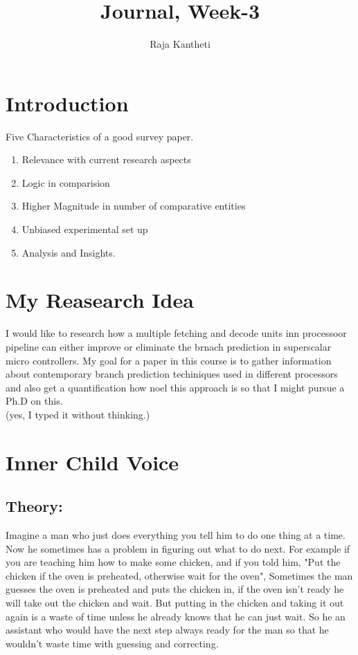 \documentclass{article}
\title{Journal, Week-3}
\author{Raja Kantheti}
\begin{document}
\maketitle

\section{Introduction}
Five Characteristics of a good survey paper.
\begin{enumerate}
    \item Relevance with current research aspects
    \item Logic in comparision
    \item Higher Magnitude in number of comparative entities
    \item Unbiased experimental set up 
    \item Analysis and Insights.
\end{enumerate}

\section{My Reasearch Idea}
I would like to research how a multiple fetching and decode
units inn processoor pipeline can either improve or eliminate
the brnach prediction in superscalar micro controllers. My goal for a paper
in this course is to gather information about contemporary branch prediction techiniques used in 
different processors and also get a quantification how noel this approach is so that I might pursue a Ph.D on this. 
\\
(yes, I typed it without thinking.)

\section{Inner Child Voice}
\subsection{Theory: }
Imagine a man who just does everything you tell him to do one thing at a time. Now he sometimes has a problem in figuring out what to do next.
For example if you are teaching him how to make some chicken, and if you told him, "Put the chicken if the oven is preheated, otherwise wait for the oven", Sometimes the man guesses
the oven is preheated and puts the chicken in, if the oven isn't ready he will take out the chicken and wait. But putting in the chicken and taking it out again is a waste of time unless he already knows
that he can just wait. So he an assistant who would have the next step always ready for the man so that he wouldn't waste time with guessing and correcting.
\end{document}
